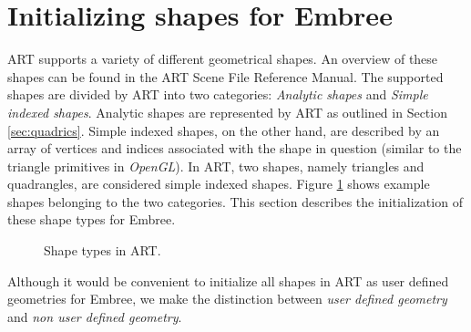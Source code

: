 \section{Initializing shapes for Embree}
ART supports a variety of different geometrical shapes. An overview of these shapes can be found in the ART Scene File Reference Manual. The supported shapes are divided by ART into two categories: \emph{Analytic shapes} and \emph{Simple indexed shapes}. Analytic shapes are represented by ART as outlined in Section \ref{sec:quadrics}. Simple indexed shapes, on the other hand, are described by an array of vertices and indices associated with the shape in question (similar to the triangle primitives in \emph{OpenGL}). In ART, two shapes, namely triangles and quadrangles, are considered simple indexed shapes. Figure \ref{fig:shape_types} shows example shapes belonging to the two categories. 
This section describes the initialization of these shape types for Embree.


\begin{figure}[!tbp]
	\centering
	\hfil
	\caption{Shape types in ART.}
	\label{fig:shape_types}
\end{figure}

Although it would be convenient to initialize all shapes in ART as user defined geometries for Embree, we make the distinction between \emph{user defined geometry} and \emph{non user defined geometry}.


